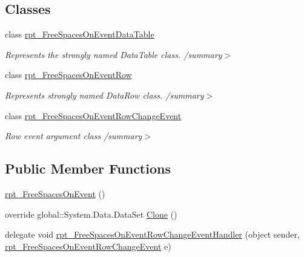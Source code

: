 \subsection*{Classes}
\begin{DoxyCompactItemize}
\item 
class \hyperlink{classprj_progra_i_i_i_1_1rpt___free_spaces_on_event_1_1rpt___free_spaces_on_event_data_table}{rpt\+\_\+\+Free\+Spaces\+On\+Event\+Data\+Table}
\begin{DoxyCompactList}\small\item\em Represents the strongly named Data\+Table class. /summary$>$ \end{DoxyCompactList}\item 
class \hyperlink{classprj_progra_i_i_i_1_1rpt___free_spaces_on_event_1_1rpt___free_spaces_on_event_row}{rpt\+\_\+\+Free\+Spaces\+On\+Event\+Row}
\begin{DoxyCompactList}\small\item\em Represents strongly named Data\+Row class. /summary$>$ \end{DoxyCompactList}\item 
class \hyperlink{classprj_progra_i_i_i_1_1rpt___free_spaces_on_event_1_1rpt___free_spaces_on_event_row_change_event}{rpt\+\_\+\+Free\+Spaces\+On\+Event\+Row\+Change\+Event}
\begin{DoxyCompactList}\small\item\em Row event argument class /summary$>$ \end{DoxyCompactList}\end{DoxyCompactItemize}
\subsection*{Public Member Functions}
\begin{DoxyCompactItemize}
\item 
\hyperlink{classprj_progra_i_i_i_1_1rpt___free_spaces_on_event_a2ed39f657ec0a43ec5d53560eece1a43}{rpt\+\_\+\+Free\+Spaces\+On\+Event} ()
\item 
override global\+::\+System.\+Data.\+Data\+Set \hyperlink{classprj_progra_i_i_i_1_1rpt___free_spaces_on_event_a16c4fb7bebced867e1fddf8dd41407d8}{Clone} ()
\item 
delegate void \hyperlink{classprj_progra_i_i_i_1_1rpt___free_spaces_on_event_a19ccb59e3a6fc2f077280510cfdf1d21}{rpt\+\_\+\+Free\+Spaces\+On\+Event\+Row\+Change\+Event\+Handler} (object sender, \hyperlink{classprj_progra_i_i_i_1_1rpt___free_spaces_on_event_1_1rpt___free_spaces_on_event_row_change_event}{rpt\+\_\+\+Free\+Spaces\+On\+Event\+Row\+Change\+Event} e)
\end{DoxyCompactItemize}
